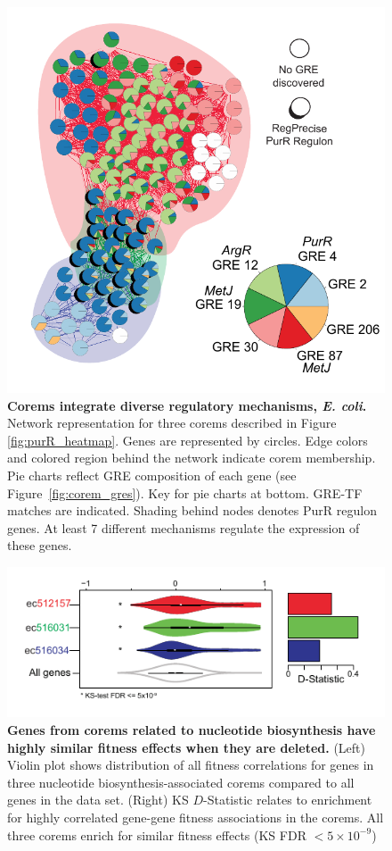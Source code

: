 \begin{figure}[h!]
\centering
\includegraphics[width=0.6\linewidth]{figures/purR_network.pdf}
\caption[Corems integrate diverse regulatory mechanisms, \textit{E. coli}]{\textbf{Corems integrate diverse regulatory mechanisms, \textit{E. coli}.} Network representation for three corems described in Figure \ref{fig:purR_heatmap}. Genes are represented by circles. Edge colors and colored region behind the network indicate corem membership. Pie charts reflect GRE composition of each gene (see Figure~\ref{fig:corem_gres}). Key for pie charts at bottom. GRE-TF matches are indicated. Shading behind nodes denotes PurR regulon genes. At least 7 different mechanisms regulate the expression of these genes.}
\label{fig:purR_network}
\end{figure}


\begin{figure}[h!]
\centering
\includegraphics[width=0.7\linewidth]{figures/purR_corem_fitness.pdf}
\caption[Genes from corems related to nucleotide biosynthesis have highly similar fitness effects when they are deleted]{\textbf{Genes from corems related to nucleotide biosynthesis have highly similar fitness effects when they are deleted.} (Left) Violin plot shows distribution of all fitness correlations for genes in three nucleotide biosynthesis-associated corems compared to all genes in the data set. (Right) KS $D$-Statistic relates to enrichment for highly correlated gene-gene fitness associations in the corems. All three corems enrich for similar fitness effects (KS FDR $< 5\times 10^{-9}$)}
\label{fig:purR_corem_fitness}
\end{figure}

